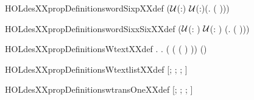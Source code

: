 \newcommand{\HOLdesXXpropDefinitionswordFourEightpXXdef}{\UseVerbatim{HOLdesXXpropDefinitionswordFourEightpXXdef}}
\begin{SaveVerbatim}{HOLdesXXpropDefinitionswordSixpXXdef}
\HOLTokenTurnstile{}  \HOLSymConst{=} (\ensuremath{{\cal{U}}}(:)\HOLSymConst{,} \ensuremath{{\cal{U}}}(:)\HOLSymConst{,}(\HOLTokenLambda{}. \HOLSymConst{\&}  \HOLSymConst{/} \HOLSymConst{\&}( \HOLSymConst{\HOLTokenExp{}} )))
\end{SaveVerbatim}
\newcommand{\HOLdesXXpropDefinitionswordSixpXXdef}{\UseVerbatim{HOLdesXXpropDefinitionswordSixpXXdef}}
\begin{SaveVerbatim}{HOLdesXXpropDefinitionswordSixxSixXXdef}
\HOLTokenTurnstile{}  \HOLSymConst{=}
   (\ensuremath{{\cal{U}}}(: \HOLTokenProd{} )\HOLSymConst{,} \ensuremath{{\cal{U}}}(: \HOLTokenProd{} )\HOLSymConst{,}
    (\HOLTokenLambda{}. \HOLSymConst{\&}  \HOLSymConst{/} \HOLSymConst{\&}( \HOLSymConst{\HOLTokenExp{}} )))
\end{SaveVerbatim}
\newcommand{\HOLdesXXpropDefinitionswordSixxSixXXdef}{\UseVerbatim{HOLdesXXpropDefinitionswordSixxSixXXdef}}
\begin{SaveVerbatim}{HOLdesXXpropDefinitionsWtextXXdef}
\HOLTokenTurnstile{} \HOLSymConst{\HOLTokenForall{}}.
       \HOLSymConst{=}
     \HOLTokenLeftbrace{} \HOLTokenBar{} \HOLSymConst{\HOLTokenExists{}}.  ( (  (  ) )) \HOLSymConst{=} (\HOLSymConst{,})\HOLTokenRightbrace{}
\end{SaveVerbatim}
\newcommand{\HOLdesXXpropDefinitionsWtextXXdef}{\UseVerbatim{HOLdesXXpropDefinitionsWtextXXdef}}
\begin{SaveVerbatim}{HOLdesXXpropDefinitionsWtextlistXXdef}
\HOLTokenTurnstile{}  \HOLSymConst{=} [; ; ; ]
\end{SaveVerbatim}
\newcommand{\HOLdesXXpropDefinitionsWtextlistXXdef}{\UseVerbatim{HOLdesXXpropDefinitionsWtextlistXXdef}}
\begin{SaveVerbatim}{HOLdesXXpropDefinitionswtransOneXXdef}
\HOLTokenTurnstile{}  \HOLSymConst{=} [; ; ; ]
\end{SaveVerbatim}
